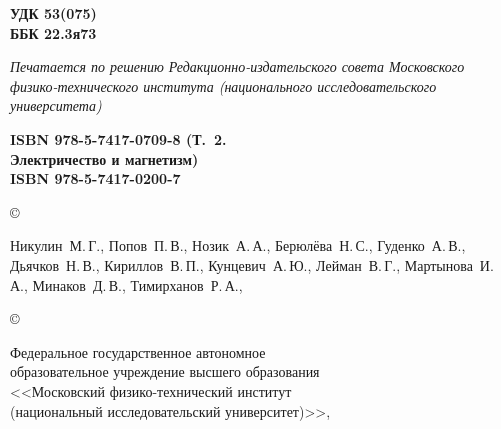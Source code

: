 {\scriptsize
\hfill\parbox{2cm}{\bfseries УДК 53(075)\\
ББК 22.3я73\par}

\vskip 4mm

{\footnotesize\noindent\itshape Печатается по решению Редакционно-издательского совета
    Московского физико-технического института
    (национального исследовательского университета)}

\vskip 4mm

\settowidth{\vva}{\scriptsize\bf Электричество и магнетизм)~~}%
\noindent
\parbox[t]{\vva}{\scriptsize\bf
ISBN 978-5-7417-0709-8 (Т.~2.\\
Электричество и магнетизм)\\[4pt]
ISBN 978-5-7417-0200-7}
\setlength{\vvc}{\textwidth}%
\addtolength{\vvc}{-0.97\vva}%
\setlength{\vvb}{2.5em}%
\addtolength{\vvc}{-\vvb}%
\hfill
\copyright~\parbox[t]{\vvc}{%
\scriptsize\strut
Никулин~М.\,Г.,
Попов~П.\,В.,
Нозик~А.\,А.,
Берюлёва~Н.\,С.,
Гуденко~А.\,В.,
Дьячков~Н.\,В.,
Кириллов~В.\,П.,
Кунцевич~А.\,Ю.,
Лейман~В.\,Г.,
Мартынова~И.\,А.,
Минаков~Д.\,В.,
Тимирханов~Р.\,А.,
\god}

\smallskip

\hfill
\copyright~\parbox[t]{\vvc}{\raggedright\scriptsize
Федеральное государственное автономное\\
образовательное учреждение высшего образования\\ 
<<Московский физико-технический институт\\ 
(национальный исследовательский университет)>>, \god}



}
